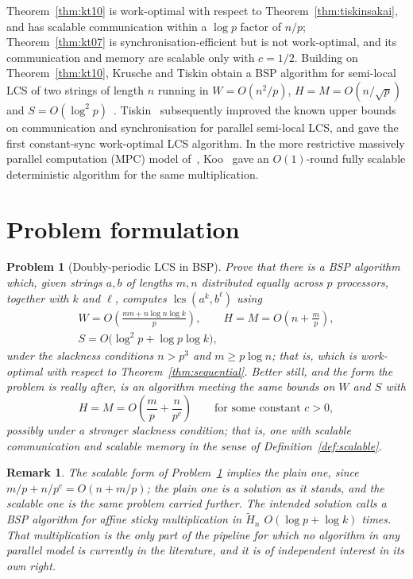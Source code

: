 \documentclass[10pt]{article}
\newtheorem{problem}{Problem}
\newtheorem{remark}[theorem]{Remark}
\newcommand{\lcs}{\operatorname{lcs}}
\begin{document}
Theorem~\ref{thm:kt10} is work-optimal with respect to
Theorem~\ref{thm:tiskinsakai}, and has scalable communication within a
$\log p$ factor of $n/p$; Theorem~\ref{thm:kt07} is synchronisation-efficient
but is not work-optimal, and its communication and memory are scalable only
with $c=1/2$. Building on Theorem~\ref{thm:kt10}, Krusche and Tiskin obtain a
BSP algorithm for semi-local LCS of two strings of length $n$ running in
$W=O(n^2/p)$, $H=M=O(n/\sqrt p)$ and
$S=O(\log^2p)$~\cite[Theorem 4.4.1]{KruscheThesis}. Tiskin~\cite{Tiskin20}
subsequently improved the known upper bounds on communication and
synchronisation for parallel semi-local LCS, and gave the first constant-sync
work-optimal LCS algorithm. In the more restrictive massively parallel
computation (MPC) model of~\cite{KSV10}, Koo~\cite{Koo24} gave an
$O(1)$-round fully scalable deterministic algorithm for the same
multiplication.

\section{Problem formulation}

\begin{problem}[Doubly-periodic LCS in BSP]\label{prob:lcs}
Prove that there is a BSP algorithm which, given strings $a,b$ of lengths
$m,n$ distributed equally across $p$ processors, together with $k$ and
$\ell$, computes $\lcs(a^k,b^\ell)$ using
\begin{gather*}
W=O\!\left(\frac{mn+n\log n\log k}{p}\right),\qquad
H=M=O\!\left(n+\frac{m}{p}\right),
\\
S=O\bigl(\log^2p+\log p\log k\bigr),
\end{gather*}
under the slackness conditions $n>p^3$ and $m\ge p\log n$; that is, which is
work-optimal with respect to Theorem~\ref{thm:sequential}.
Better still, and the form the problem is really after, is an algorithm
meeting the same bounds on $W$ and $S$ with
\[
H=M=O\!\left(\frac{m}{p}+\frac{n}{p^c}\right)
\qquad\text{for some constant }c>0,
\]
possibly under a stronger slackness condition; that is, one with scalable
communication and scalable memory in the sense of
Definition~\ref{def:scalable}.
\end{problem}

\begin{remark}\label{rem:monotone}
The scalable form of Problem~\ref{prob:lcs} implies the plain one, since
$m/p+n/p^c=O(n+m/p)$; the plain one is a solution as it stands, and the
scalable one is the same problem carried further.
The intended solution calls a BSP algorithm for affine sticky multiplication
in $\tilde H_n$ $O(\log p+\log k)$ times. That multiplication is the only part
of the pipeline for which no algorithm in any parallel model is currently in
the literature, and it is of independent interest in its own right.
\end{remark}
\end{document}
